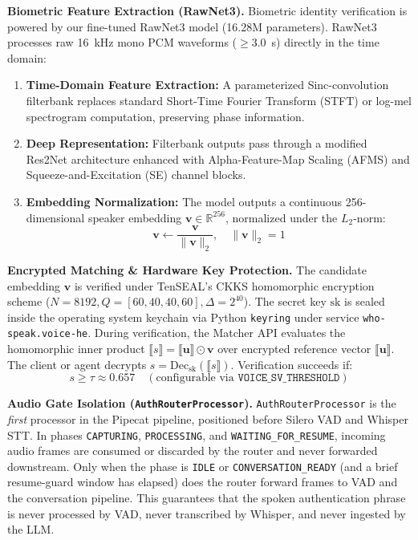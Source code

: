 \textbf{Biometric Feature Extraction (RawNet3).} Biometric identity verification is powered by our fine-tuned RawNet3 model (16.28M parameters). RawNet3 processes raw 16~kHz mono PCM waveforms ($\ge 3.0$~s) directly in the time domain:
\begin{enumerate}
    \item \textbf{Time-Domain Feature Extraction:} A parameterized Sinc-convolution filterbank replaces standard Short-Time Fourier Transform (STFT) or log-mel spectrogram computation, preserving phase information.
    \item \textbf{Deep Representation:} Filterbank outputs pass through a modified Res2Net architecture enhanced with Alpha-Feature-Map Scaling (AFMS) and Squeeze-and-Excitation (SE) channel blocks.
    \item \textbf{Embedding Normalization:} The model outputs a continuous 256-dimensional speaker embedding $\mathbf{v} \in \mathbb{R}^{256}$, normalized under the $L_2$-norm:
    \begin{equation}
        \mathbf{v} \leftarrow \frac{\mathbf{v}}{\|\mathbf{v}\|_2}, \quad \|\mathbf{v}\|_2 = 1
    \end{equation}
\end{enumerate}

\textbf{Encrypted Matching \& Hardware Key Protection.} The candidate embedding $\mathbf{v}$ is verified under TenSEAL's CKKS homomorphic encryption scheme ($N=8192, Q=[60,40,40,60], \Delta=2^{40}$). The secret key $\text{sk}$ is sealed inside the operating system keychain via Python \texttt{keyring} under service \texttt{who-speak.voice-he}. During verification, the Matcher API evaluates the homomorphic inner product $\llbracket s \rrbracket = \llbracket \mathbf{u} \rrbracket \odot \mathbf{v}$ over encrypted reference vector $\llbracket \mathbf{u} \rrbracket$. The client or agent decrypts $s = \text{Dec}_{\text{sk}}(\llbracket s \rrbracket)$. Verification succeeds if:
\begin{equation}
    s \ge \tau \approx 0.657 \quad (\text{configurable via } \texttt{VOICE\_SV\_THRESHOLD})
\end{equation}

\textbf{Audio Gate Isolation (\texttt{AuthRouterProcessor}).} \texttt{AuthRouterProcessor} is the \emph{first} processor in the Pipecat pipeline, positioned before Silero VAD and Whisper STT. In phases \texttt{CAPTURING}, \texttt{PROCESSING}, and \texttt{WAITING\_FOR\_RESUME}, incoming audio frames are consumed or discarded by the router and never forwarded downstream. Only when the phase is \texttt{IDLE} or \texttt{CONVERSATION\_READY} (and a brief resume-guard window has elapsed) does the router forward frames to VAD and the conversation pipeline. This guarantees that the spoken authentication phrase is never processed by VAD, never transcribed by Whisper, and never ingested by the LLM.

